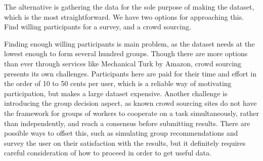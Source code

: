 The alternative is gathering the data for the sole purpose of making the dataset, which is the most straightforward. We have two options for approaching this. Find willing participants for a survey, and a crowd sourcing.

Finding enough willing participants is main problem, as the dataset needs at the lowest enough to form several hundred groups. Though there are more options than ever through services like Mechanical Turk by Amazon, crowd sourcing presents its own challenges. Participants here are paid for their time and effort in the order of 10 to 50 cents per user, which is a reliable way of motivating participation, but makes a large dataset expensive. Another challenge is introducing the group decision aspect, as known crowd sourcing sites do not have the framework for groups of workers to cooperate on a task simultaneously, rather than independently, and reach a consensus before submitting results. There are possible ways to offset this, such as simulating group recommendations and survey the user on their satisfaction with the results, but it definitely requires careful consideration of how to proceed in order to get useful data.

